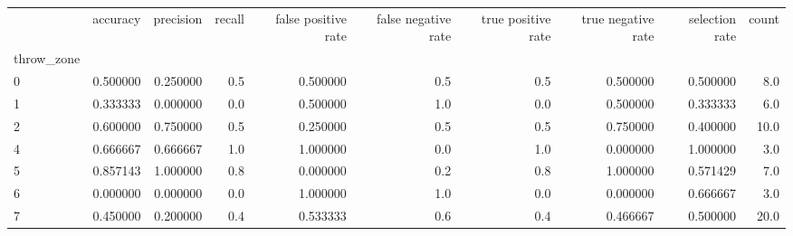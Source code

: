 \begin{tabular}{lrrrrrrrrr}
\toprule
{} &  accuracy &  precision &  recall &  false positive rate &  false negative rate &  true positive rate &  true negative rate &  selection rate &  count \\
throw\_zone &           &            &         &                      &                      &                     &                     &                 &        \\
\midrule
0          &  0.500000 &   0.250000 &     0.5 &             0.500000 &                  0.5 &                 0.5 &            0.500000 &        0.500000 &    8.0 \\
1          &  0.333333 &   0.000000 &     0.0 &             0.500000 &                  1.0 &                 0.0 &            0.500000 &        0.333333 &    6.0 \\
2          &  0.600000 &   0.750000 &     0.5 &             0.250000 &                  0.5 &                 0.5 &            0.750000 &        0.400000 &   10.0 \\
4          &  0.666667 &   0.666667 &     1.0 &             1.000000 &                  0.0 &                 1.0 &            0.000000 &        1.000000 &    3.0 \\
5          &  0.857143 &   1.000000 &     0.8 &             0.000000 &                  0.2 &                 0.8 &            1.000000 &        0.571429 &    7.0 \\
6          &  0.000000 &   0.000000 &     0.0 &             1.000000 &                  1.0 &                 0.0 &            0.000000 &        0.666667 &    3.0 \\
7          &  0.450000 &   0.200000 &     0.4 &             0.533333 &                  0.6 &                 0.4 &            0.466667 &        0.500000 &   20.0 \\
\bottomrule
\end{tabular}
